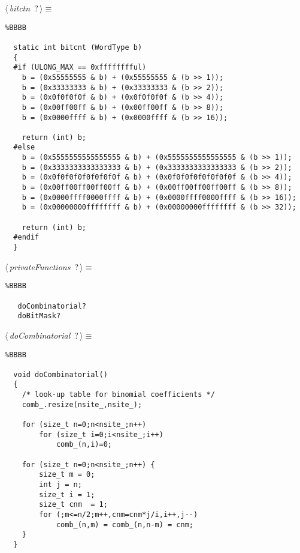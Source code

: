 \documentclass{report}
\begin{document}
\begin{flushleft} \small
\begin{minipage}{\linewidth}\label{scrap12}\raggedright\small
{} $\langle\,${\it bitctn}\nobreak\ {\footnotesize {?}}$\,\rangle\equiv$
\begin{lstlisting}%BBBB
    
  static int bitcnt (WordType b)  
  {  
  #if (ULONG_MAX == 0xfffffffful)  
  	b = (0x55555555 & b) + (0x55555555 & (b >> 1));  
  	b = (0x33333333 & b) + (0x33333333 & (b >> 2));  
  	b = (0x0f0f0f0f & b) + (0x0f0f0f0f & (b >> 4));  
  	b = (0x00ff00ff & b) + (0x00ff00ff & (b >> 8));  
  	b = (0x0000ffff & b) + (0x0000ffff & (b >> 16));  
    
  	return (int) b;  
  #else  
  	b = (0x5555555555555555 & b) + (0x5555555555555555 & (b >> 1));  
  	b = (0x3333333333333333 & b) + (0x3333333333333333 & (b >> 2));  
  	b = (0x0f0f0f0f0f0f0f0f & b) + (0x0f0f0f0f0f0f0f0f & (b >> 4));  
  	b = (0x00ff00ff00ff00ff & b) + (0x00ff00ff00ff00ff & (b >> 8));  
  	b = (0x0000ffff0000ffff & b) + (0x0000ffff0000ffff & (b >> 16));  
  	b = (0x00000000ffffffff & b) + (0x00000000ffffffff & (b >> 32));  
    
  	return (int) b;  
  #endif  
  }  \end{lstlisting}
\end{minipage}\vspace{4ex}
\end{flushleft}
\begin{flushleft} \small
\begin{minipage}{\linewidth}\label{scrap13}\raggedright\small
{} $\langle\,${\it privateFunctions}\nobreak\ {\footnotesize {?}}$\,\rangle\equiv$
\begin{lstlisting}%BBBB
    
   doCombinatorial?  
   doBitMask?  
   \end{lstlisting}
\end{minipage}\vspace{4ex}
\end{flushleft}
\begin{flushleft} \small
\begin{minipage}{\linewidth}\label{scrap14}\raggedright\small
{} $\langle\,${\it doCombinatorial}\nobreak\ {\footnotesize {?}}$\,\rangle\equiv$
\begin{lstlisting}%BBBB
    
  void doCombinatorial()  
  {  
  	/* look-up table for binomial coefficients */  
  	comb_.resize(nsite_,nsite_);  
    
  	for (size_t n=0;n<nsite_;n++)  
  		for (size_t i=0;i<nsite_;i++)  
  			comb_(n,i)=0;  
    
  	for (size_t n=0;n<nsite_;n++) {  
  		size_t m = 0;  
  		int j = n;  
  		size_t i = 1;  
  		size_t cnm  = 1;  
  		for (;m<=n/2;m++,cnm=cnm*j/i,i++,j--)  
  			comb_(n,m) = comb_(n,n-m) = cnm;  
  	}  
  }  \end{lstlisting}
\end{minipage}\vspace{4ex}
\end{flushleft}
\end{document}
